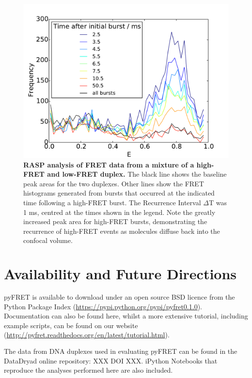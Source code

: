 \begin{figure}[!ht]
   \begin{center}
      \includegraphics*[clip=true, width=6in]{pyFRET/RASP_performance.pdf}
      \caption{{\bf RASP analysis of FRET data from a mixture of a high-FRET and low-FRET duplex.} The black line shows the baseline peak areas for the two duplexes. Other lines show the FRET histograms generated from bursts that occurred at the indicated time following a high-FRET burst. The Recurrence Interval $\Delta$T was 1 ms, centred at the times shown in the legend. Note the greatly increased peak area for high-FRET bursts, demonstrating the recurrence of high-FRET events as molecules diffuse back into the confocal volume.}
      \label{fig:fig9_RASP}
   \end{center}
\end{figure}

\section{Availability and Future Directions}
\label{sect:availability}
pyFRET is available to download under an open source BSD licence from the Python Package Index (\url{https://pypi.python.org/pypi/pyfret0.1.0}). Documentation can also be found here, whilst a more extensive tutorial, including example scripts, can be found on our website (\url{http://pyfret.readthedocs.org/en/latest/tutorial.html}).

The data from DNA duplexes used in evaluating pyFRET can be found in the DataDryad online repository: XXX DOI XXX. iPython Notebooks that reproduce the analyses performed here are also included.

